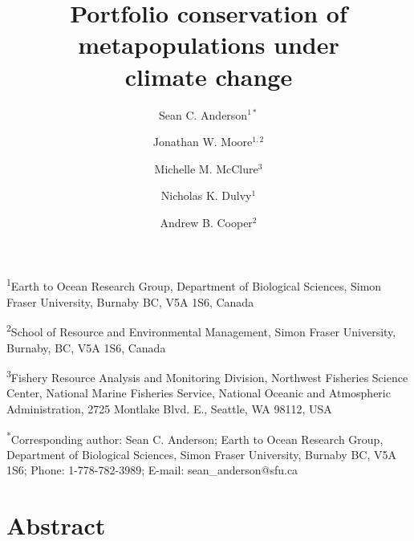 \documentclass[12pt,english]{article}
\title{Portfolio conservation of metapopulations under\\climate change}
\author{
Sean C. Anderson$^{1\ast}$ \and Jonathan W. Moore$^{1,2}$ \and Michelle M. McClure$^3$ \and
Nicholas K. Dulvy$^1$ \and Andrew B. Cooper$^2$
}
\date{}
\begin{document}
\raggedright

\begin{spacing}{1.1}
\setlength\parskip{0.11in}
\setlength\parindent{0in}
%
\setlength\parskip{0in}
\end{spacing}

\setcounter{page}{1}
\linenumbers

\begin{spacing}{1.9}
\setlength{\parindent}{0.9cm}

\maketitle

%
\noindent
\textsuperscript{1}Earth to Ocean Research Group, Department of Biological Sciences, Simon Fraser University, Burnaby BC, V5A 1S6, Canada

\noindent
\textsuperscript{2}School of Resource and Environmental Management, Simon Fraser University, Burnaby, BC, V5A 1S6, Canada

\noindent
\textsuperscript{3}Fishery Resource Analysis and Monitoring Division, Northwest Fisheries Science Center, National Marine Fisheries Service, National Oceanic and Atmospheric Administration, 2725 Montlake Blvd. E., Seattle, WA 98112, USA

\noindent
\textsuperscript{*}Corresponding author: Sean C. Anderson; Earth to Ocean Research Group, Department of Biological Sciences, Simon Fraser University, Burnaby BC, V5A 1S6; Phone: 1-778-782-3989; E-mail: sean\_anderson@sfu.ca

\clearpage

\section{Abstract}\label{abstract}


\end{spacing}
\end{document}
